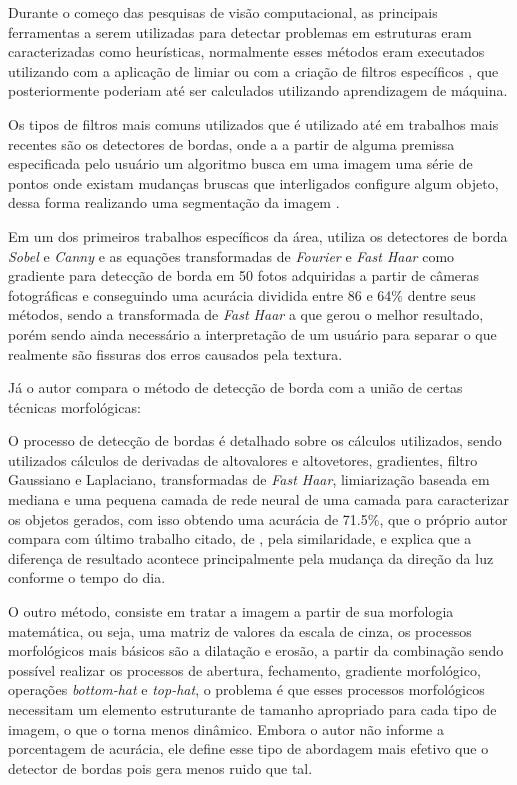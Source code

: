 Durante o começo das pesquisas de visão computacional, as principais ferramentas a serem utilizadas para detectar problemas em estruturas eram caracterizadas como heurísticas, normalmente esses métodos eram executados utilizando com a aplicação de limiar ou com a criação de filtros específicos \cite{spencer2019advances}, que posteriormente poderiam até ser calculados utilizando aprendizagem de máquina.

Os tipos de filtros mais comuns utilizados que é utilizado até em trabalhos mais recentes são os detectores de bordas, onde a a partir de alguma premissa especificada pelo usuário um algoritmo busca em uma imagem uma série de pontos onde existam mudanças bruscas que interligados configure algum objeto, dessa forma realizando uma segmentação da imagem \cite{ziou1998edge}.

Em um dos primeiros trabalhos específicos da área,  utiliza os detectores de borda \textit{Sobel} e \textit{Canny} e as equações transformadas de \textit{Fourier} e \textit{Fast Haar} como gradiente para detecção de borda em 50 fotos adquiridas a partir de câmeras fotográficas e conseguindo uma acurácia dividida entre 86 e 64\% dentre seus métodos, sendo a transformada de \textit{Fast Haar} a que gerou o melhor resultado, porém sendo ainda necessário a interpretação de um usuário para separar o que realmente são fissuras dos erros causados pela textura. 

Já o autor  compara o método de detecção de borda com a união de certas técnicas morfológicas:

O processo de detecção de bordas é detalhado sobre os cálculos utilizados, sendo utilizados cálculos de derivadas de altovalores e altovetores, gradientes, filtro Gaussiano e Laplaciano, transformadas de \textit{Fast Haar}, limiarização baseada em mediana e uma pequena camada de rede neural de uma camada para caracterizar os objetos gerados, com isso obtendo uma acurácia de 71.5\%, que o próprio autor compara com último trabalho citado, de \cite{abdel2003analysis}, pela similaridade, e explica que a diferença de resultado acontece principalmente pela mudança da direção da luz conforme o tempo do dia. 

O outro método, consiste em tratar a imagem a partir de sua morfologia matemática, ou seja, uma matriz de valores da escala de cinza, os processos morfológicos mais básicos são a dilatação e erosão, a partir da combinação sendo possível realizar os processos de abertura, fechamento, gradiente morfológico, operações \textit{bottom-hat} e \textit{top-hat}, o problema é que esses processos morfológicos necessitam um elemento estruturante de tamanho apropriado para cada tipo de imagem, o que o torna menos dinâmico. Embora o autor não informe a porcentagem de acurácia, ele define esse tipo de abordagem mais efetivo que o detector de bordas pois gera menos ruido que tal.

